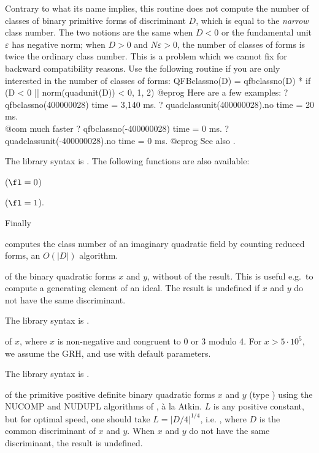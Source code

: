  Contrary to what its name implies, this routine does not
compute the number of classes of binary primitive forms of discriminant $D$,
which is equal to the \emph{narrow} class number. The two notions are the same
when $D < 0$ or the fundamental unit $\varepsilon$ has negative norm; when $D
> 0$ and $N\varepsilon > 0$, the number of classes of forms is twice the
ordinary class number. This is a problem which we cannot fix for backward
compatibility reasons. Use the following routine if you are only interested
in the number of classes of forms:
\bprog
QFBclassno(D) =
qfbclassno(D) * if (D < 0 || norm(quadunit(D)) < 0, 1, 2)
@eprog\noindent
Here are a few examples:
\bprog
? qfbclassno(400000028)
time = 3,140 ms.
? quadclassunit(400000028).no
time = 20 ms. \\@com{ much faster}
? qfbclassno(-400000028)
time = 0 ms.
? quadclassunit(-400000028).no
time = 0 ms.
@eprog\noindent
See also .

The library syntax is .
The following functions are also available:

 ($\fl = 0$)

 ($\fl = 1$).

\noindent Finally

 computes the class number of an imaginary
quadratic field by counting reduced forms, an $O(|D|)$ algorithm.

\label{se:qfbcompraw}
 of the binary quadratic forms $x$ and $y$, without
 of the result. This is useful e.g.~to compute a generating
element of an ideal. The result is undefined if $x$ and $y$ do not have the
same discriminant.

The library syntax is .

\label{se:qfbhclassno}
 of $x$, where
$x$ is non-negative and congruent to 0 or 3 modulo 4. For $x > 5\cdot
10^5$, we assume the GRH, and use  with default
parameters.

The library syntax is .

\label{se:qfbnucomp}
 of the primitive positive
definite binary quadratic forms $x$ and $y$ (type ) using the NUCOMP
and NUDUPL algorithms of , \`a la Atkin. $L$ is any positive
constant, but for optimal speed, one should take $L=|D/4|^{1/4}$, i.e.
, where $D$ is the common discriminant of $x$ and
$y$. When $x$ and $y$ do not have the same discriminant, the result is
undefined.

